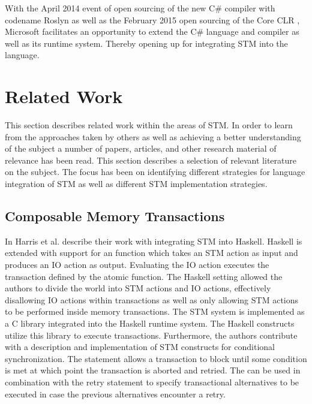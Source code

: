 With the April 2014 event of open sourcing of the new C\# compiler\cite{roslyn} with codename Roslyn as well as the February 2015 open sourcing of the Core \ac{CLR} \cite{coreclr}, Microsoft facilitates an opportunity to extend the C\# language and compiler as well as its runtime system. Thereby opening up for integrating \ac{STM} into the language.
\section{Related Work}
\label{sec:intro_related_work}
This section describes related work within the areas of \ac{STM}. In order to learn from the approaches taken by others as well as achieving a better understanding of the subject a number of papers, articles, and other research material of relevance has been read. This section describes a selection of relevant literature on the subject. The focus has been on identifying different strategies for language integration of \ac{STM} as well as different \ac{STM} implementation strategies.

\subsection{Composable Memory Transactions}
In \cite{harris2005composable} Harris et al. describe their work with integrating \ac{STM} into Haskell. Haskell is extended with support for an  function which takes an \ac{STM} action as input and produces an \ac{IO} action as output\cite[p. 51]{harris2005composable}. Evaluating the IO action executes the transaction defined by the atomic function. The Haskell setting allowed the authors to divide the world into \ac{STM} actions and \ac{IO} actions\cite[p. 51]{harris2005composable}, effectively disallowing \ac{IO} actions within transactions as well as only allowing \ac{STM} actions to be performed inside memory transactions. The \ac{STM} system is implemented as a C library integrated into the Haskell runtime system. The Haskell constructs utilize this library to execute transactions\cite[p. 56]{harris2005composable}. Furthermore, the authors contribute with a description and implementation of \ac{STM} constructs for conditional synchronization. The  statement allows a transaction to block until some condition is met at which point the transaction is aborted and retried\cite[p. 52]{harris2005composable}. The  can be used in combination with the retry statement to specify transactional alternatives to be executed in case the previous alternatives encounter a retry\cite[p. 52]{harris2005composable}.


